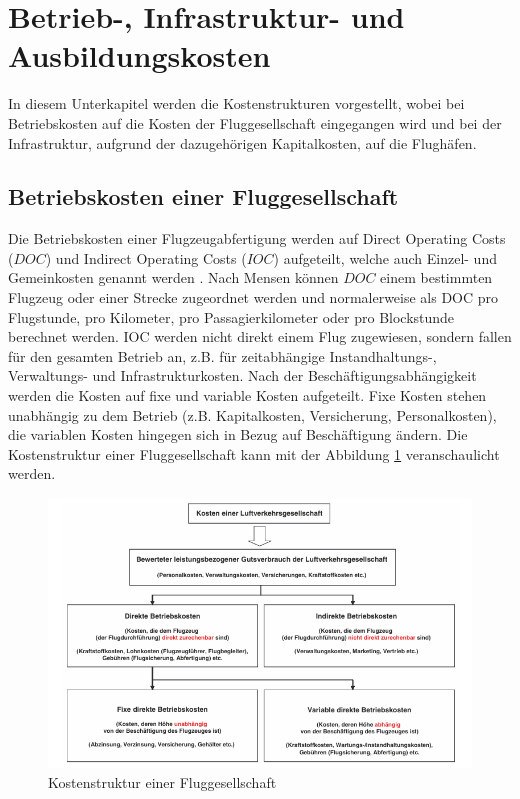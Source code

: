 \section{Betrieb-, Infrastruktur- und Ausbildungskosten}
\label{s:Kosten}
In diesem Unterkapitel werden die Kostenstrukturen vorgestellt, 
wobei bei Betriebskosten auf die Kosten der Fluggesellschaft
eingegangen wird und bei der Infrastruktur, aufgrund der dazugehörigen Kapitalkosten, auf die Flughäfen.
%
\subsection{Betriebskosten einer Fluggesellschaft}

Die Betriebskosten einer Flugzeugabfertigung werden auf Direct Operating Costs ($DOC$) und Indirect Operating Costs 
($IOC$) aufgeteilt, welche auch Einzel- und\\ Gemeinkosten genannt werden \cite{conrady2019luftverkehr}. 
Nach Mensen \cite{mensen2013handbuch} können $DOC$ einem bestimmten Flugzeug oder einer Strecke zugeordnet 
werden und normalerweise als DOC pro Flugstunde, pro Kilometer, pro Passagierkilometer oder pro Blockstunde 
berechnet werden. IOC werden nicht direkt einem Flug zugewiesen, sondern fallen für den gesamten Betrieb an, 
z.B. für zeitabhängige Instandhaltungs-, Verwaltungs- und Infrastrukturkosten. 
Nach der Beschäftigungsabhängigkeit werden die Kosten auf fixe und variable Kosten aufgeteilt. 
Fixe Kosten stehen unabhängig zu dem Betrieb (z.B. Kapitalkosten, Versicherung, Personalkosten), 
die variablen Kosten hingegen sich in Bezug auf Beschäftigung ändern.
%
Die Kostenstruktur einer Fluggesellschaft kann mit der Abbildung \ref{doc} veranschaulicht werden.
%
\begin{figure}[h]
	\centering
	\includegraphics[width=0.9\linewidth]{Bilder/Systematik der DOC_Berechnung.png}
	\caption[Kostenstruktur einer Fluggesellschaft]{Kostenstruktur einer Fluggesellschaft \cite{mensen2013handbuch}}
	\label{doc}
\end{figure}

